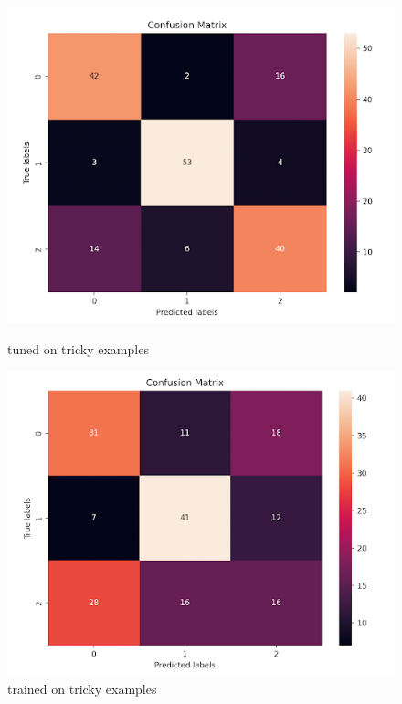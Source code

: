 \documentclass{article}
\begin{document}
\begin{figure}[!h]
  \centering
  \begin{minipage}{0.47\textwidth}
    \includegraphics[width=\linewidth]{images/confusion_tuned_tricky.png}
    \caption{tuned on tricky examples}
    \label{fig:d}
  \end{minipage}
  \hfill
  \begin{minipage}{0.47\textwidth}
    \includegraphics[width=\linewidth]{images/confusion_trained_tricky.png}
    \caption{trained on tricky examples}
    \label{fig:e}
  \end{minipage}
\end{figure}
\end{document}
